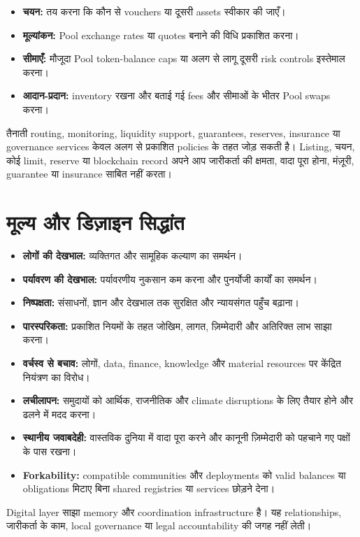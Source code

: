 \documentclass[11pt]{article}
\begin{document}
\begin{itemize}[leftmargin=*]
\item \textbf{चयन:} तय करना कि कौन से vouchers या दूसरी assets स्वीकार की जाएँ।
\item \textbf{मूल्यांकन:} Pool exchange rates या quotes बनाने की विधि प्रकाशित करना।
\item \textbf{सीमाएँ:} मौजूदा Pool token-balance caps या अलग से लागू दूसरी risk controls इस्तेमाल करना।
\item \textbf{आदान-प्रदान:} inventory रखना और बताई गई fees और सीमाओं के भीतर Pool swaps करना।
\end{itemize}
तैनाती routing, monitoring, liquidity support, guarantees, reserves, insurance या governance services केवल अलग से प्रकाशित policies के तहत जोड़ सकती है। Listing, चयन, कोई limit, reserve या blockchain record अपने आप जारीकर्ता की क्षमता, वादा पूरा होना, मंज़ूरी, guarantee या insurance साबित नहीं करता।

\section*{मूल्य और डिज़ाइन सिद्धांत}

\begin{itemize}[leftmargin=*]
\item \textbf{लोगों की देखभाल:} व्यक्तिगत और सामूहिक कल्याण का समर्थन।
\item \textbf{पर्यावरण की देखभाल:} पर्यावरणीय नुकसान कम करना और पुनर्योजी कार्यों का समर्थन।
\item \textbf{निष्पक्षता:} संसाधनों, ज्ञान और देखभाल तक सुरक्षित और न्यायसंगत पहुँच बढ़ाना।
\item \textbf{पारस्परिकता:} प्रकाशित नियमों के तहत जोखिम, लागत, ज़िम्मेदारी और अतिरिक्त लाभ साझा करना।
\item \textbf{वर्चस्व से बचाव:} लोगों, data, finance, knowledge और material resources पर केंद्रित नियंत्रण का विरोध।
\item \textbf{लचीलापन:} समुदायों को आर्थिक, राजनीतिक और climate disruptions के लिए तैयार होने और ढलने में मदद करना।
\item \textbf{स्थानीय जवाबदेही:} वास्तविक दुनिया में वादा पूरा करने और कानूनी ज़िम्मेदारी को पहचाने गए पक्षों के पास रखना।
\item \textbf{Forkability:} compatible communities और deployments को valid balances या obligations मिटाए बिना shared registries या services छोड़ने देना।
\end{itemize}
Digital layer साझा memory और coordination infrastructure है। यह relationships, जारीकर्ता के काम, local governance या legal accountability की जगह नहीं लेती।
\end{document}
